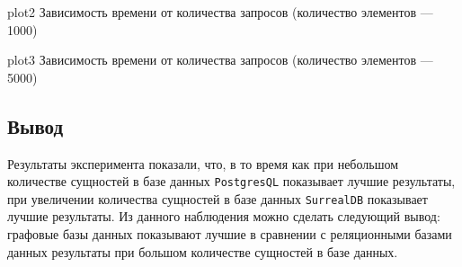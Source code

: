 \img{100mm}
{plot2}
{Зависимость времени от количества запросов (количество элементов --- 1000)}

\img{100mm}
{plot3}
{Зависимость времени от количества запросов (количество элементов --- 5000)}

\clearpage

\subsection*{Вывод}
Результаты эксперимента показали, что, в то время как при небольшом количестве сущностей в базе данных \texttt{PostgresQL} показывает лучшие результаты, при увеличении количества сущностей в базе данных \texttt{SurrealDB} показывает лучшие результаты.
Из данного наблюдения можно сделать следующий вывод:
графовые базы данных показывают лучшие в сравнении с реляционными базами данных результаты при большом количестве сущностей в базе данных.

